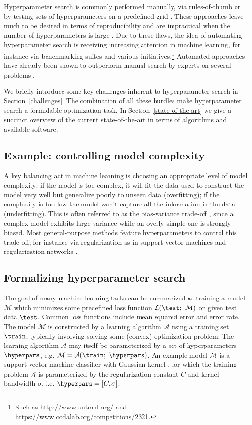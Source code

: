 Hyperparameter search is commonly performed manually, via rules-of-thumb \citep{hsu2003practical,hinton2012practical} or by testing sets of hyperparameters on a predefined grid \citep{pedregosa2011scikit}. These approaches leave much to be desired in terms of reproducibility and are impractical when the number of hyperparameters is large \citep{claesen2014easy}. Due to these flaws, the idea of automating hyperparameter search is receiving increasing attention in  machine learning, for instance via benchmarking suites \citep{eggensperger2013towards} and various initiatives.\footnote{Such as \url{http://www.automl.org/} and \url{https://www.codalab.org/competitions/2321}.}
Automated approaches have already been shown to outperform manual search by experts on several problems \citep{ bergstra2011algorithms,bergstra2012random}. 

We briefly introduce some key challenges inherent to hyperparameter search in Section~\ref{challenges}. The combination of all these hurdles make hyperparameter search a formidable optimization task. In Section~\ref{state-of-the-art} we give a succinct overview of the current state-of-the-art in terms of algorithms and available software.

\subsection{Example: controlling model complexity}
A key balancing act in machine learning is choosing an appropriate level of model complexity: if the model is too complex, it will fit the data used to construct the model very well but generalize poorly to unseen data (overfitting); if the complexity is too low the model won't capture all the information in the data (underfitting). This is often referred to as the bias-variance trade-off \citep{geman1992neural, cucker2002best}, since a complex model exhibits large variance while an overly simple one is strongly biased. Most general-purpose methods feature hyperparameters to control this trade-off; for instance via regularization as in support vector machines and regularization networks \citep{evgeniou2000regularization,hastie2004entire}.

\subsection{Formalizing hyperparameter search}
The goal of many machine learning tasks can be summarized as training a model $\mathcal{M}$ which minimizes some predefined loss function $\mathcal{L}(\test;\ \mathcal{M})$ on given test data $\test$. Common loss functions include mean squared error and error rate. The model $\mathcal{M}$ is constructed by a learning algorithm $\mathcal{A}$ using a training set $\train$; typically involving solving some (convex) optimization problem. The learning algorithm $\mathcal{A}$ may itself be parameterized by a set of hyperparameters $\hyperpars$, e.g. $\mathcal{M} = \mathcal{A}(\train;\ \hyperpars)$. An example model $\mathcal{M}$ is a support vector machine classifier with Gaussian kernel \citep{scholkopf2002learning}, for which the training problem $\mathcal{A}$ is parameterized by the regularization constant $C$ and kernel bandwidth $\sigma$, i.e. $\hyperpars = [C,\sigma]$.

